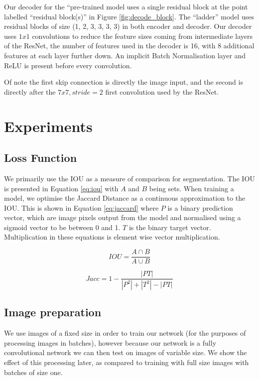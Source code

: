 \documentclass{IEEEtran}
\begin{document}
Our decoder for the ``pre-trained model uses a single residual block at the point labelled ``residual block(s)'' in Figure \ref{fig:decode_block}. The ``ladder'' model uses residual blocks of size (1, 2, 3, 3, 3, 3) in both encoder and decoder. Our decoder uses $ 1x1 $ convolutions to reduce the feature sizes coming from intermediate layers of the ResNet, the number of features used in the decoder is 16, with 8 additional features at each layer further down. An implicit Batch Normalisation layer and ReLU is present before every convolution.

Of note the first skip connection is directly the image input, and the second is directly after the $7x7, stride=2$ first convolution used by the ResNet.


\section {Experiments}


\subsection {Loss Function}


We primarily use the \gls{IOU} as a measure of comparison for segmentation. The \gls{IOU} is presented in Equation \ref{eq:iou} with $ A $ and $ B $ being sets. When training a model, we optimise the Jaccard Distance as a continuous approximation to the \gls{IOU}. This is shown in Equation \ref{eq:jaccard} where $ P $ is a binary prediction vector, which are image pixels output from the model and normalised using a sigmoid vector to be between 0 and 1. $ T $ is the binary target vector. Multiplication in these equations is element wise vector multiplication.


\begin{equation}
IOU = \frac{A \cap B}{A \cup B}
\label{eq:iou}
\end{equation}


\begin{equation}
Jacc = 1 - \frac{| PT |}{| P^2 | + | T^2 | - | PT |}
\label{eq:jaccard}
\end{equation}



\subsection {Image preparation}

We use images of a fixed size in order to train our network (for the purposes of processing images in batches), however because our network is a fully convolutional network we can then test on images of variable size. We show the effect of this processing later, as compared to training with full size images with batches of size one.
\end{document}
